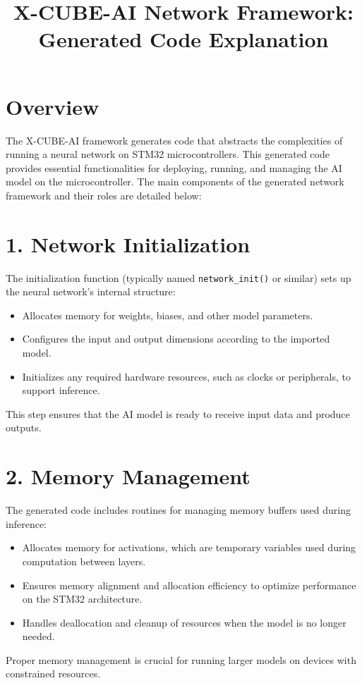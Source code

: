 \documentclass{article}
\title{X-CUBE-AI Network Framework: Generated Code Explanation}
\begin{document}
\maketitle

\section*{Overview}

The X-CUBE-AI framework generates code that abstracts the complexities of running a neural network on STM32 microcontrollers. This generated code provides essential functionalities for deploying, running, and managing the AI model on the microcontroller. The main components of the generated network framework and their roles are detailed below:

\section*{1. Network Initialization}
The initialization function (typically named \texttt{network\_init()} or similar) sets up the neural network's internal structure:
\begin{itemize}
    \item Allocates memory for weights, biases, and other model parameters.
    \item Configures the input and output dimensions according to the imported model.
    \item Initializes any required hardware resources, such as clocks or peripherals, to support inference.
\end{itemize}
This step ensures that the AI model is ready to receive input data and produce outputs.

\section*{2. Memory Management}
The generated code includes routines for managing memory buffers used during inference:
\begin{itemize}
    \item Allocates memory for activations, which are temporary variables used during computation between layers.
    \item Ensures memory alignment and allocation efficiency to optimize performance on the STM32 architecture.
    \item Handles deallocation and cleanup of resources when the model is no longer needed.
\end{itemize}
Proper memory management is crucial for running larger models on devices with constrained resources.
\end{document}
